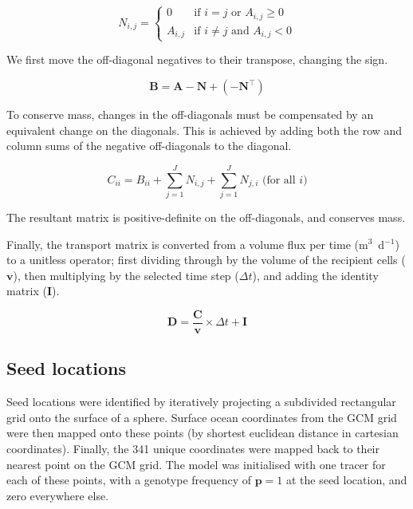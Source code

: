 \documentclass[12pt]{article}
\begin{document}
\begin{equation}
N_{i,j} = 
\begin{cases}
0 		& \text{if $i=j$ or $A_{i,j}\ge 0$}\\
A_{i,j} 	& \text{if $i\ne j$ and $A_{i,j}<0 $}
\end{cases}
\end{equation}

We first move the off-diagonal negatives to their transpose, changing the sign.

\begin{equation}
\mathbf{B} = \mathbf{A} - \mathbf{N} + ( - \mathbf{N}^\top)
\end{equation}

To conserve mass, changes in the off-diagonals must be compensated by an equivalent change on the diagonals. This is achieved by adding both the row and column sums of the negative off-diagonals to the diagonal. 

\begin{equation}
C_{i i} = B_{i i} + \sum_{j=1}^J N_{i,j} + \sum_{j=1}^J N_{j,i} \text{ (for all $i$)}
\end{equation}

The resultant matrix is positive-definite on the off-diagonals, and conserves mass.

Finally, the transport matrix is converted from a volume flux per time (m$^3$~d$^{-1}$) to a unitless operator; first dividing through by the volume of the recipient cells ($\mathbf{v}$), then multiplying by the selected time step ($\Delta t$), and adding the identity matrix ($\mathbf{I}$).

\begin{equation}
\mathbf{D} = \frac{\mathbf{C}}{\mathbf{v}} \times \Delta t + \mathbf{I}
\end{equation}

\subsection{Seed locations}

Seed locations were identified by iteratively projecting a subdivided rectangular grid onto the surface of a sphere. Surface ocean coordinates from the GCM grid were then mapped onto these points (by shortest euclidean distance in cartesian coordinates). Finally, the 341 unique coordinates were mapped back to their nearest point on the GCM grid. The model was initialised with one tracer for each of these points, with a genotype frequency of $\mathbf{p} = 1$ at the seed location, and zero everywhere else. 




\end{document}

